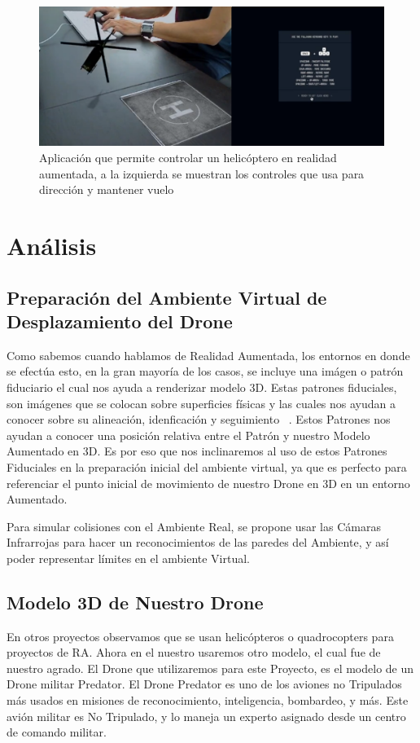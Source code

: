 \documentclass[a4paper]{article}
\begin{document}
\begin{figure}[h!]
  \centering
  \includegraphics[width=0.95\linewidth, keepaspectratio]{helicopteroAR}
  \caption{Aplicación que permite controlar un helicóptero en realidad aumentada, a la izquierda se muestran los controles que usa para dirección y mantener vuelo}
  \label{fig:Helicoptero AR}
\end{figure}

\section{Análisis}

\subsection{Preparación del Ambiente Virtual de Desplazamiento del Drone}
Como sabemos cuando hablamos de Realidad Aumentada, los entornos en donde se efectúa esto, en la gran mayoría de los casos, se incluye una imágen o patrón fiduciario el cual nos ayuda a renderizar modelo 3D. Estas patrones fiduciales, son imágenes que se colocan sobre superficies físicas y las cuales nos ayudan a conocer sobre su alineación, idenficación y seguimiento ~\cite{bestfiducial}. Estos Patrones nos ayudan a conocer una posición relativa entre el Patrón y nuestro Modelo Aumentado en 3D. Es por eso que nos inclinaremos al uso de estos Patrones Fiduciales en la preparación inicial del ambiente virtual, ya que es perfecto para referenciar el punto inicial de movimiento de nuestro Drone en 3D en un entorno Aumentado.

Para simular colisiones con el Ambiente Real, se propone usar las Cámaras Infrarrojas para hacer un reconocimientos de las paredes del Ambiente, y así poder representar límites en el ambiente Virtual.

\subsection{Modelo 3D de Nuestro Drone}
En otros proyectos observamos que se usan helicópteros o quadrocopters para proyectos de RA. Ahora en el nuestro usaremos otro modelo, el cual fue de nuestro agrado. El Drone que utilizaremos para este Proyecto, es el modelo de un Drone militar Predator. El Drone Predator es uno de los aviones no Tripulados más usados en misiones de reconocimiento, inteligencia, bombardeo, y más. Este avión militar es No Tripulado, y lo maneja un experto asignado desde un centro de comando militar. 
\end{document}
